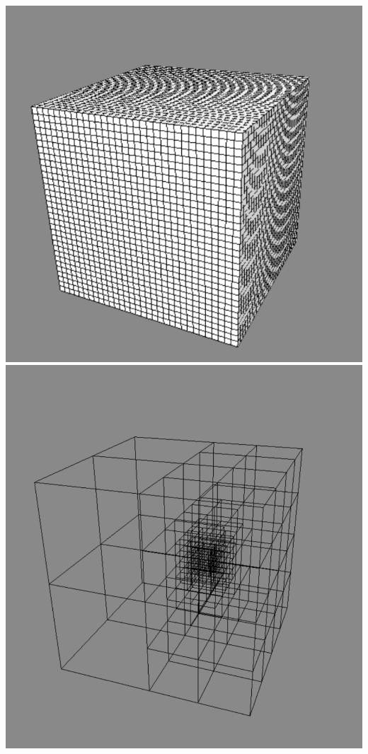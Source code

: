 \begin{frame}
\begin{columns}
\end{columns}
\ \\
\centering
\includegraphics[scale=0.2]{figures/unifgrid.pdf}
\includegraphics[scale=0.1192]{figures/adapgrid.pdf}
\end{frame}


